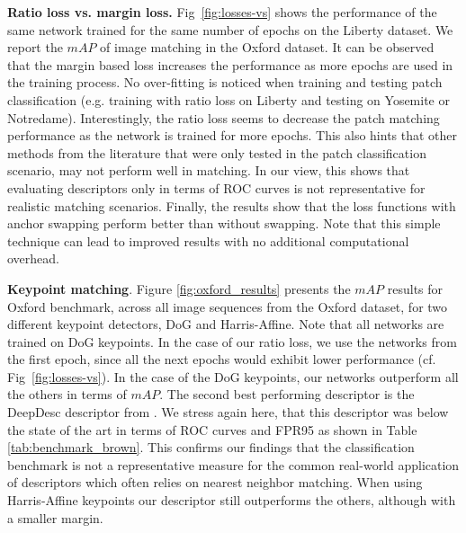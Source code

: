 \textbf{Ratio loss vs. margin loss.} Fig~\ref{fig:losses-vs} shows the performance of the same network trained for the same number of epochs on the Liberty dataset. We report the $mAP$  of image matching in the Oxford dataset. It can be observed that the margin based loss increases the performance as more epochs are used in the training process. No over-fitting is noticed when training and testing patch classification (e.g. training with ratio loss on Liberty and testing on Yosemite or Notredame). Interestingly, the ratio loss seems to decrease the patch matching performance as the network is trained for more epochs. This also hints that other methods from the literature that were only tested in the patch classification scenario, may not perform well in matching. In our view, this shows that evaluating descriptors only in terms of ROC curves is not representative for realistic matching scenarios. Finally, the results show that the loss functions with anchor swapping perform better than without swapping. Note that this simple technique can lead to improved results with no additional computational overhead.

\textbf{Keypoint matching}. Figure \ref{fig:oxford_results} presents the $mAP$ results for Oxford benchmark,
across all image sequences from the Oxford dataset, for two
different  keypoint detectors, DoG and Harris-Affine. Note that all
networks are trained on DoG keypoints. In the case of our ratio loss, we use the networks from the first epoch, since all the next
epochs would exhibit lower performance (cf. Fig~\ref{fig:losses-vs}).
In the case of the DoG keypoints, our networks outperform
all the others in terms of $mAP$. The second best performing
descriptor is the DeepDesc descriptor from \cite{simo2015deepdesc}. We
stress again here, that this descriptor was below the state of
the art in terms of ROC curves and FPR95 as shown in Table
\ref{tab:benchmark_brown}. This confirms our findings that the
classification benchmark is not a representative measure for the  common
real-world application of descriptors which often relies on nearest neighbor matching. When using
Harris-Affine keypoints our descriptor still outperforms the others,
although with a smaller margin.


